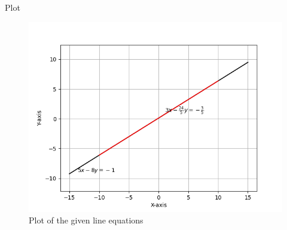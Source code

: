 \documentclass{beamer}
\begin{document}
\begin{frame}{Plot}
    \begin{figure}
        \centering
        \includegraphics[width=0.5\columnwidth]{../figs/plot.png}
        \caption{Plot of the given line equations}
        \label{fig:fig}
    \end{figure}
\end{frame}
\end{document}

